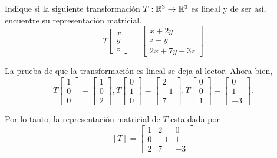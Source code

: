 \begin{problema}
 Indique si la siguiente transformaci\'on $T:\mathbb{R}^{3}\to \mathbb{R}^{3}$ es lineal y de ser as\'i, encuentre su representaci\'on
matricial.
\begin{equation}
\label{trans_exmp}
 T\begin{bmatrix}
    x\\y\\z
   \end{bmatrix}=
   \begin{bmatrix}
    x+2y \\ z-y\\ 2x+7y-3z
   \end{bmatrix}
\end{equation}

\end{problema}

\begin{sol}
 La prueba de que la transformaci\'on es lineal se deja al lector. Ahora bien,
 $$
T\begin{bmatrix}
  1\\0\\0
 \end{bmatrix}
=\begin{bmatrix}
  1\\0\\2
 \end{bmatrix},
 T\begin{bmatrix}
  0\\1\\0
 \end{bmatrix}
=\begin{bmatrix}
  2\\-1\\7
 \end{bmatrix},
T\begin{bmatrix}
  0\\0\\1
 \end{bmatrix}
=\begin{bmatrix}
  0\\1\\-3
 \end{bmatrix}.
 $$

 Por lo tanto, la representaci\'on matricial de $T$ esta dada por
 $$
[T]=\begin{bmatrix}
1 & 2 & 0 \\
0 & -1 & 1 \\
2 & 7 & -3
 \end{bmatrix}
 $$
\end{sol}



